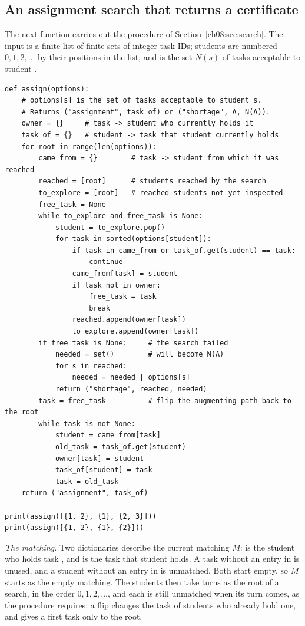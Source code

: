 \subsection*{An assignment search that returns a certificate}
The next function carries out the procedure of Section~\ref{ch08:sec:search}. The input  is a finite list of finite sets of integer task IDs; students are numbered $0,1,2,\ldots$ by their positions in the list, and  is the set $N(s)$ of tasks acceptable to student .
\begin{lstlisting}
def assign(options):
    # options[s] is the set of tasks acceptable to student s.
    # Returns ("assignment", task_of) or ("shortage", A, N(A)).
    owner = {}     # task -> student who currently holds it
    task_of = {}   # student -> task that student currently holds
    for root in range(len(options)):
        came_from = {}        # task -> student from which it was reached
        reached = [root]      # students reached by the search
        to_explore = [root]   # reached students not yet inspected
        free_task = None
        while to_explore and free_task is None:
            student = to_explore.pop()
            for task in sorted(options[student]):
                if task in came_from or task_of.get(student) == task:
                    continue
                came_from[task] = student
                if task not in owner:
                    free_task = task
                    break
                reached.append(owner[task])
                to_explore.append(owner[task])
        if free_task is None:     # the search failed
            needed = set()        # will become N(A)
            for s in reached:
                needed = needed | options[s]
            return ("shortage", reached, needed)
        task = free_task          # flip the augmenting path back to the root
        while task is not None:
            student = came_from[task]
            old_task = task_of.get(student)
            owner[task] = student
            task_of[student] = task
            task = old_task
    return ("assignment", task_of)

print(assign([{1, 2}, {1}, {2, 3}]))
print(assign([{1, 2}, {1}, {2}]))
\end{lstlisting}
\emph{The matching.} Two dictionaries describe the current matching $M$:  is the student who holds task , and  is the task that student  holds. A task without an entry in  is unused, and a student without an entry in  is unmatched. Both start empty, so $M$ starts as the empty matching. The students then take turns as the root of a search, in the order $0,1,2,\ldots$, and each is still unmatched when its turn comes, as the procedure requires: a flip changes the task of students who already hold one, and gives a first task only to the root.

